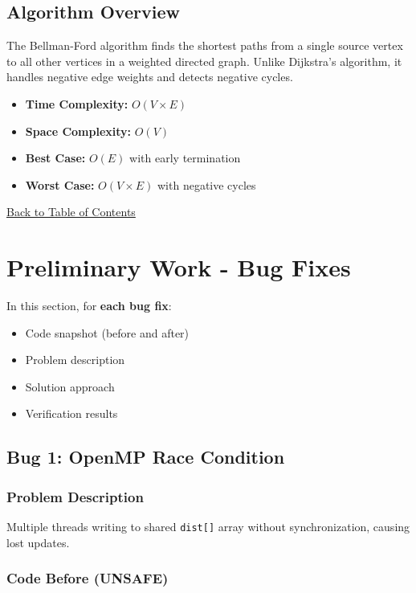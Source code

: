 \documentclass[12pt,a4paper]{article}
\begin{document}
\subsection{Algorithm Overview}

The Bellman-Ford algorithm finds the shortest paths from a single source vertex to all other vertices in a weighted directed graph. Unlike Dijkstra's algorithm, it handles negative edge weights and detects negative cycles.

\begin{itemize}
    \item \textbf{Time Complexity:} $O(V \times E)$
    \item \textbf{Space Complexity:} $O(V)$
    \item \textbf{Best Case:} $O(E)$ with early termination
    \item \textbf{Worst Case:} $O(V \times E)$ with negative cycles
\end{itemize}

\hyperref[contents]{\small Back to Table of Contents}

\section{Preliminary Work - Bug Fixes}

In this section, for \textbf{each bug fix}:
\begin{itemize}
    \item Code snapshot (before and after)
    \item Problem description
    \item Solution approach
    \item Verification results
\end{itemize}

\subsection{Bug 1: OpenMP Race Condition}

\subsubsection*{Problem Description}

Multiple threads writing to shared \texttt{dist[]} array without synchronization, causing lost updates.

\subsubsection*{Code Before (UNSAFE)}
\end{document}
